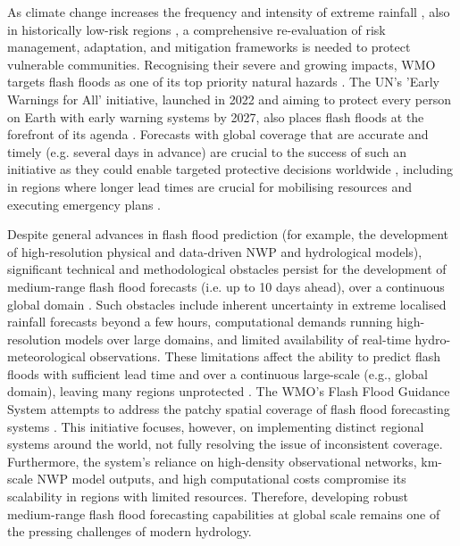 As  climate change increases the frequency and intensity of extreme rainfall \citep{WMO_2025, IPCC_2023}, also in historically low-risk regions \citep{Fowler_2021c}, a comprehensive re-evaluation of risk management, adaptation, and mitigation frameworks is needed to protect vulnerable communities. Recognising their severe and growing impacts, WMO targets flash floods as one of its top priority natural hazards \citep{WMO_2025}. The UN's 'Early Warnings for All' initiative, launched in 2022 and aiming to protect every person on Earth with early warning systems by 2027, also places flash floods at the forefront of its agenda \citep{UN_2022}. Forecasts with global coverage that are accurate and timely (e.g. several days in advance) are crucial to the success of such an initiative as they could enable targeted protective decisions worldwide \citep{Merz_2020}, including in regions where longer lead times are crucial for mobilising resources and executing emergency plans \citep{Bazo_2019}. 

Despite  general advances in flash flood prediction (for example, the development of high-resolution physical and data-driven NWP and hydrological models), significant technical and methodological obstacles persist for the development of medium-range flash flood forecasts (i.e. up to 10 days ahead), over a continuous global domain \citep{Zanchetta_2020}. Such obstacles include inherent uncertainty in extreme localised rainfall forecasts beyond a few hours, computational demands running high-resolution models over large domains, and limited availability of real-time hydro-meteorological observations. These limitations affect the ability to predict flash floods with sufficient lead time and over a continuous large-scale (e.g., global domain), leaving many regions unprotected \citep{AlRawas_2024}. The WMO's Flash Flood Guidance System attempts to address the patchy spatial coverage of flash flood forecasting systems \citep{Georgakakos_2022}. This initiative focuses, however, on implementing distinct regional systems around the world, not fully resolving the issue of inconsistent coverage. Furthermore, the system's reliance on high-density observational networks, km-scale NWP model outputs, and high computational costs compromise its scalability in regions with limited resources. Therefore, developing robust medium-range flash flood forecasting capabilities at global scale remains one of the pressing challenges of modern hydrology.

